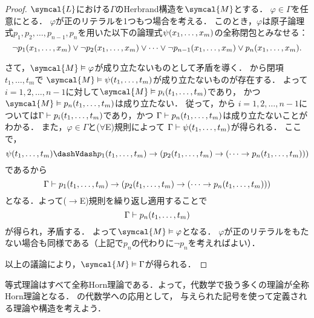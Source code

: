 
\begin{proof}
	\(\symcal{L}\)における\(\Gamma\)のHerbrand構造を\(\symcal{M}\)とする．
	\(\varphi \in \Gamma\)を任意にとる．
	\(\varphi\)が正のリテラルを1つもつ場合を考える．
	このとき，\(\varphi\)は原子論理式\(p_1, p_2, \dots, p_{n-1}, p_n\)を用いた以下の論理式\(\apply{\psi}{x_1, \dots, x_m}\)の全称閉包とみなせる：
	\[
		\lnot \apply{p_1}{x_1, \dots, x_m} \lor \lnot \apply{p_2}{x_1, \dots, x_m} \lor \dotsb \lor \lnot \apply{p_{n-1}}{x_1, \dots, x_m}
		\lor \apply{p_{n}}{x_1, \dots, x_m}.
	\]

	さて，\(\symcal{M} \satisfy \varphi\)が成り立たないものとして矛盾を導く．
	から閉項\(t_1, \dots, t_m\)で
	\(\symcal{M} \satisfy \apply{\psi}{t_1, \dots, t_m}\)が成り立たないものが存在する．
	よって\(i = 1, 2, \dots, n-1\)に対して\(\symcal{M} \satisfy \apply{p_i}{t_1, \dots, t_m}\)であり，
	かつ\(\symcal{M} \satisfy \apply{p_n}{t_1, \dots, t_m}\)は成り立たない．
	従って，から
	\(i = 1,2,\dots, n-1\)については\(\Gamma \provable \apply{p_i}{t_1, \dots, t_m}\)であり，かつ
	\(\Gamma \provable \apply{p_n}{t_1, \dots, t_m}\)は成り立たないことがわかる．
	また，\(\varphi \in \Gamma\)と(\(\forall\)E)規則によって
	\(\Gamma \provable \apply{\psi}{t_1, \dots, t_m}\)が得られる．
	ここで，
	\[
		\apply{\psi}{t_1, \dots, t_m} \interderivable \apply{p_1}{t_1, \dots, t_m} \to \paren{\apply{p_2}{t_1, \dots, t_m} \to \paren{\dotsb \to \apply{p_n}{t_1, \dots, t_m}}}
	\]
	であるから
	\[
		\Gamma \provable \apply{p_1}{t_1, \dots, t_m} \to \paren{\apply{p_2}{t_1, \dots, t_m} \to \paren{\dotsb \to \apply{p_n}{t_1, \dots, t_m}}}
	\]
	となる．よって(\(\to\)E)規則を繰り返し適用することで
	\[
		\Gamma \provable \apply{p_n}{t_1, \dots, t_m}
	\]
	が得られ，矛盾する．
	よって\(\symcal{M} \satisfy \varphi\)となる．
	\(\varphi\)が正のリテラルをもたない場合も同様である（上記で\(p_n\)の代わりに\(\lnot p_n\)を考えればよい）．

	以上の議論により，\(\symcal{M} \satisfy \Gamma\)が得られる．
\end{proof}


等式理論はすべて全称Horn理論である．よって，代数学で扱う多くの理論が全称Horn理論となる．
の代数学への応用として，
与えられた記号を使って定義される理論や構造を考えよう．

